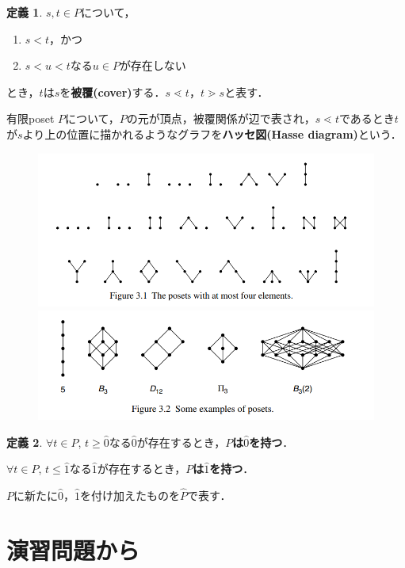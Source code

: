 \documentclass[xelatex,ja=standard,a4paper,14pt,everyparhook=compat]{bxjsarticle}
\theoremstyle{definition}
\newtheorem*{definition*}{定義}
\begin{document}
\begin{definition*}
    $s,t \in P$について， \begin{enumerate}
        \item $s < t$，かつ
        \item $s < u < t$なる$u \in P$が存在しない
    \end{enumerate}
    とき，$t$は$s$を\textbf{被覆(cover)}する．$s \lessdot t$，$t \gtrdot s$と表す．

    有限poset $P$について，$P$の元が頂点，被覆関係が辺で表され，$s \lessdot t$であるとき$t$が$s$より上の位置に描かれるようなグラフを\textbf{ハッセ図(Hasse diagram)}という．

    \begin{figure}[h]
        \centering
        \includegraphics[width=.9\textwidth]{Fig3.1.png}
        \includegraphics[width=.9\textwidth]{Fig3.2.png}
    \end{figure}
\end{definition*}

\begin{definition*}
    $\forall t \in P$, $t \geq \hat 0$なる$\hat 0$が存在するとき，\textbf{$P$は$\hat 0$を持つ}．

    $\forall t \in P$, $t \leq \hat 1$なる$\hat 1$が存在するとき，\textbf{$P$は$\hat 1$を持つ}．

    $P$に新たに$\hat 0$，$\hat 1$を付け加えたものを$\widehat P$で表す．
\end{definition*}

\section*{演習問題から}
\end{document}
